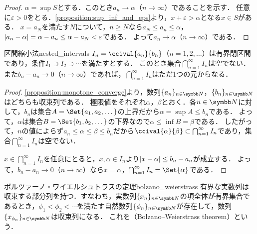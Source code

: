 \documentclass[../../main]{subfiles}
\begin{document}
\begin{proof}
  \(\alpha=\sup S\)とする．このとき\(a_n\to\alpha\)（\(n\to\infty\)）であることを示す．
  任意に\(\varepsilon>0\)をとる．\cref{proposition:sup_inf_and_eps}より，\(x+\varepsilon>\alpha\)となる\(x\in S\)がある．
  \(x=a_N\)を満たす\(N\)について，\(n\geq N\)なら\(a_N\leq a_n\leq\alpha\)，\(\lvert a_n-\alpha\rvert=\alpha-a_n\leq\alpha-a_N<\varepsilon\)である．
  よって\(a_n\to\alpha\)（\(n\to\infty\)）である．
\end{proof}

\begin{proposition}{区間縮小法}{nested_intervals}
  \(I_n=\ccival{a_n}{b_n}\)（\(n=1,2,\dotsc\)）は有界閉区間であり，条件\(I_1\supset I_2\supset\dotsb\)を満たすとする．
  このとき集合\(\bigcap_{n=1}^\infty I_n\)は空でない．また\(b_n-a_n\to 0\)（\(n\to\infty\)）であれば，\(\bigcap_{n=1}^\infty I_n\)はただ1つの元からなる．
\end{proposition}

\begin{proof}
  \cref{proposition:monotone_converge}より，数列\(\seq{a_n}_{n\in\numset{N}}\)，\(\seq{b_n}_{n\in\numset{N}}\)はどちらも収束列である．
  極限値をそれぞれ\(\alpha\)，\(\beta\)とおく．各\(n\in\numset{N}\)に対して，\(b_n\)は集合\(A=\Set{a_1,a_2,\dotsc}\)の上界だから\(\alpha=\sup A\leq b_n\)である．
  よって，\(\alpha\)は集合\(B=\Set{b_1,b_2,\dotsc}\)の下界なので\(\alpha\leq\inf B=\beta\)である．
  したがって，\(n\)の値によらず\(a_n\leq\alpha\leq\beta\leq b_n\)だから\(\ccival{\alpha}{\beta}\subset\bigcap_{n=1}^\infty I_n\)であり，集合\(\bigcap_{n=1}^\infty I_n\)は空でない．

  \(x\in\bigcap_{n=1}^\infty I_n\)を任意にとると，\(x,\alpha\in I_n\)より\(\lvert x-\alpha\rvert\leq b_n-a_n\)が成立する．
  よって，\(b_n-a_n\to 0\)（\(n\to\infty\)）なら\(x=\alpha\)，\(\bigcap_{n=1}^\infty I_n=\Set{\alpha}\)である．
\end{proof}

\begin{theorem}{ボルツァーノ・ワイエルシュトラスの定理}{bolzano_weierstrass}
  有界な実数列は収束する部分列を持つ．すなわち，実数列\(\seq{x_n}_{n\in\numset{N}}\)の項全体が有界集合であるとき，\(\phi_1<\phi_2<\dotsb\)を満たす自然数列\(\seq{\phi_n}_{n\in\numset{N}}\)が存在して，数列\(\seq{x_{\phi_n}}_{n\in\numset{N}}\)は収束列になる．
  これを（Bolzano–Weierstrass theorem）という．
\end{theorem}
\end{document}
